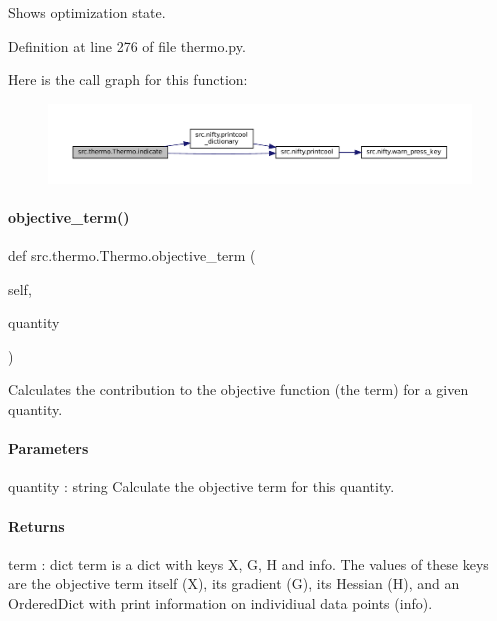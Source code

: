 Shows optimization state. 



Definition at line 276 of file thermo.\+py.

Here is the call graph for this function\+:
\nopagebreak
\begin{figure}[H]
\begin{center}
\leavevmode
\includegraphics[width=350pt]{classsrc_1_1thermo_1_1Thermo_a608afc83596d03d41f3860ce4bcedfea_cgraph}
\end{center}
\end{figure}
\mbox{\label{classsrc_1_1thermo_1_1Thermo_abb7c8739b6b88d7dd08a80f5561ba6f1}} 
\paragraph{\texorpdfstring{objective\+\_\+term()}{objective\_term()}}
{\footnotesize\ttfamily def src.\+thermo.\+Thermo.\+objective\+\_\+term (\begin{DoxyParamCaption}\item[{}]{self,  }\item[{}]{quantity }\end{DoxyParamCaption})}



Calculates the contribution to the objective function (the term) for a given quantity. 

\paragraph*{Parameters }

quantity \+: string Calculate the objective term for this quantity.

\paragraph*{Returns }

term \+: dict {\ttfamily term} is a dict with keys {\ttfamily X}, {\ttfamily G}, {\ttfamily H} and {\ttfamily info}. The values of these keys are the objective term itself ({\ttfamily X}), its gradient ({\ttfamily G}), its Hessian ({\ttfamily H}), and an Ordered\+Dict with print information on individiual data points ({\ttfamily info}). 

